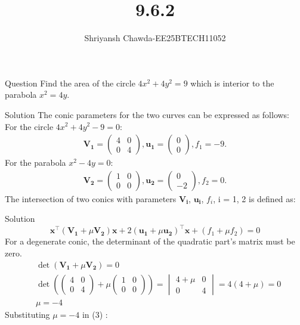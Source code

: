 \documentclass{beamer}
\title{9.6.2}
\author{Shriyansh Chawda-EE25BTECH11052}
\newcommand{\myvec}[1]{\ensuremath{\begin{pmatrix}#1\end{pmatrix}}}
\begin{document}
	

		\frame{\titlepage}
	
	
	

	\begin{frame}{Question} 
Find the area of the circle $4x^{2} + 4y^{2} = 9$ which is interior to the parabola $x^{2} = 4y.$\\
\end{frame}
	
\begin{frame}{Solution}
The conic parameters for the two curves can be expressed as follows:\\
For the circle $4x^2 + 4y^2 - 9 = 0$:
\begin{align}
	\mathbf{V_1} = \myvec{4 & 0 \\ 0 & 4}, \mathbf{u_1} = \myvec{0 \\ 0}, f_1 = -9. 
\end{align}
For the parabola $x^2 - 4y = 0$:
\begin{align}
	\mathbf{V_2} = \myvec{1 & 0 \\ 0 & 0}, \mathbf{u_2} = \myvec{0 \\ -2}, f_2 = 0. 
\end{align}
The intersection of two conics with parameters $\mathbf{V_i}$, $\mathbf{u_i}$, $f_i$, i = 1, 2 is defined as:
\end{frame}



\begin{frame}{Solution}
\begin{equation}
	\mathbf{x}^\top(\mathbf{V_1} + \mu\mathbf{V_2})\mathbf{x} + 2(\mathbf{u_1} + \mu\mathbf{u_2})^\top\mathbf{x} + (f_1 + \mu f_2) = 0 
\end{equation}
For a degenerate conic, the determinant of the quadratic part's matrix must be zero.
\begin{align}
	&\det(\mathbf{V_1} + \mu\mathbf{V_2}) = 0 \\
	&\det\left(\myvec{4 & 0 \\ 0 & 4} + \mu\myvec{1 & 0 \\ 0 & 0}\right) =
	\begin{vmatrix}
		4+\mu & 0 \\
		0 & 4
	\end{vmatrix}
	= 4(4+\mu) = 0 \\
	&\mu = -4
\end{align}
Substituting $\mu = -4$ in (3) :
\end{frame}
\end{document}
